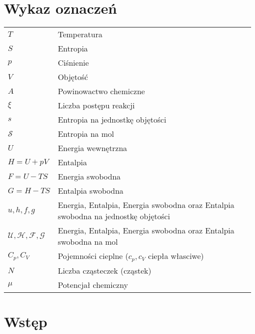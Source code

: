 \documentclass[10pt, a4paper, twoside, onecolumn]{article}
\numberwithin{equation}{section}
\begin{document}
	\section*{Wykaz oznaczeń}
	\setlength{\parindent}{0cm}
	\begin{table}[H]
	\begin{tabular}{@{} ll}
		\(T\) & Temperatura \\
		\(S\) & Entropia \\
		\(p\) & Ciśnienie \\
		\(V\) & Objętość \\
		\(A\) & Powinowactwo chemiczne \\
		\(\xi\) & Liczba postępu reakcji \\
		\(s\) & Entropia na jednostkę objętości \\
		\(\mathscr{S}\) & Entropia na mol \\
		\(U\) & Energia wewnętrzna \\
		\(H=U+pV\) & Entalpia \\
		\(F=U-TS\) & Energia swobodna \\
		\(G=H-TS\) & Entalpia swobodna \\
		\(u, h, f, g\) & Energia, Entalpia, Energia swobodna oraz Entalpia swobodna na jednostkę objętości \\
		\(\mathscr{U, H, F, G}\) & Energia, Entalpia, Energia swobodna oraz Entalpia swobodna na mol \\
		\(C_{p}, C_{V}\) & Pojemności cieplne (\(c_{p}, c_{V}\) ciepła własciwe) \\
		\(N\) & Liczba cząsteczek (cząstek) \\
		\(\mu\) & Potencjał chemiczny
	\end{tabular}
	\end{table}
	\setlength{\parindent}{1.25cm}
	\pagebreak
	
	\section{Wstęp}
	
\end{document}
